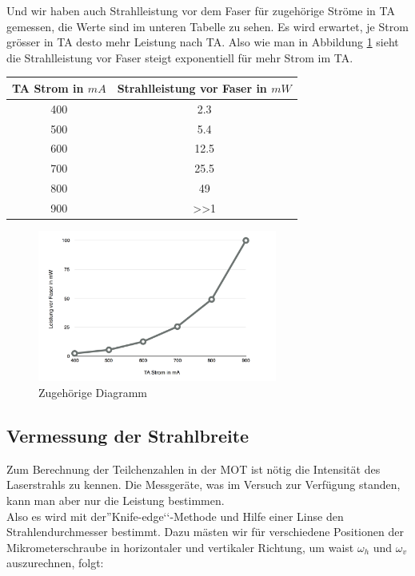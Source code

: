\documentclass[12pt, a4paper]{article}
\begin{document}
Und wir haben auch Strahlleistung vor dem Faser für zugehörige Ströme in TA gemessen, die Werte sind im  unteren Tabelle zu sehen. Es wird  erwartet, je Strom grösser in TA  desto mehr Leistung nach TA. Also wie man in Abbildung \ref{TA} sieht die Strahlleistung vor Faser steigt exponentiell für mehr Strom im TA.\\
\begin{center}
 \begin{tabular}{|c|c|}\hline
 TA Strom in $mA$&Strahlleistung vor Faser in $mW$\\ \hline \hline
400&2.3\\ \hline
500&5.4\\ \hline
600&12.5\\ \hline
700&25.5\\ \hline
800&49\\ \hline
900& >>1\\ \hline
\end{tabular}
\end{center}

    \begin{figure}[h!]
  \centering
  \includegraphics[width=0.7\textwidth]{TA.png}
  \caption{Zugehörige Diagramm}
  \label{TA}
  \end{figure}
  \subsection{Vermessung der Strahlbreite}
  Zum Berechnung der Teilchenzahlen in der MOT ist nötig die Intensität des Laserstrahls zu kennen. Die Messgeräte, was im Versuch zur Verfügung standen, kann man aber nur die Leistung bestimmen.\\
  Also es wird mit der''Knife-edge‘‘-Methode und Hilfe einer Linse den Strahlendurchmesser bestimmt. Dazu mästen wir für verschiedene Positionen der Mikrometerschraube in horizontaler und vertikaler Richtung, um waist $\omega_h$ und $\omega_v$ auszurechnen, folgt:\\
  
\end{document}
